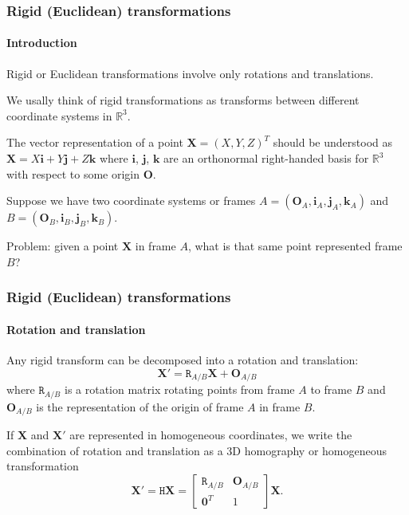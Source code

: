 \documentclass[aspectratio=169]{beamer}
\renewcommand{\vec}[1]{\boldsymbol{#1}}
\newcommand{\mat}[1]{\mathtt{#1}}
\def\Rset{\mathbb{R}}
\begin{document}
\begin{frame}
\frametitle{Rigid (Euclidean) transformations}
\framesubtitle{Introduction}

\alert{Rigid} or Euclidean transformations involve only rotations and
translations.

\medskip

We usally think of rigid transformations as \alert{transforms between
  different coordinate systems} in $\Rset^3$.

\medskip

The vector representation of a point $\vec{X} = (X,Y,Z)^T$ should be
understood as $\vec{X} = X\vec{i} + Y\vec{j} + Z\vec{k}$ where
$\vec{i}$, $\vec{j}$, $\vec{k}$ are an orthonormal right-handed basis
for $\Rset^3$ with respect to some origin $\vec{O}$.

\medskip

Suppose we have two coordinate systems or frames $A =
(\vec{O}_A,\vec{i}_A,\vec{j}_A,\vec{k}_A)$ and $B =
(\vec{O}_B,\vec{i}_B,\vec{j}_B,\vec{k}_B).$

\medskip

Problem: given a point $\vec{X}$ in frame $A$, what is that same point
represented frame $B$?

\end{frame}

\begin{frame}
\frametitle{Rigid (Euclidean) transformations}
\framesubtitle{Rotation and translation}

Any rigid transform can be decomposed into a rotation and translation:
\begin{equation*}
\vec{X}' = \mat{R}_{A/B} \vec{X} + \vec{O}_{A/B}
\end{equation*}
where $\mat{R}_{A/B}$ is a \alert{rotation matrix} rotating points
from frame $A$ to frame $B$ and $\vec{O}_{A/B}$ is the representation
of the origin of frame $A$ in frame $B$.

\medskip

If $\vec{X}$ and $\vec{X}'$ are represented in homogeneous
coordinates, we write the combination of rotation and translation
as a 3D homography or \alert{homogeneous transformation}
\begin{equation*}
\vec{X}' = \mat{H} \vec{X} =
 \begin{bmatrix} \mat{R}_{A/B} & \vec{O}_{A/B} \\ \vec{0}^T & 1
 \end{bmatrix}
  \vec{X}.
\end{equation*}

\end{frame}
\end{document}
